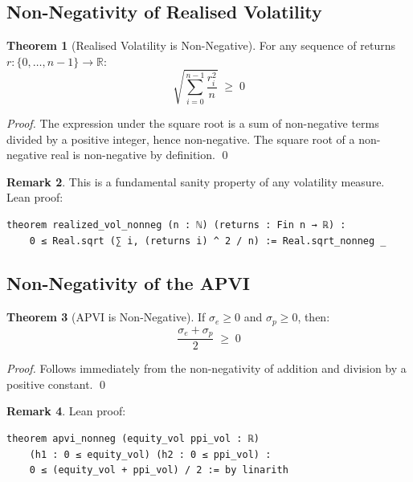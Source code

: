 \documentclass[12pt, a4paper]{article}
\theoremstyle{definition}
\newtheorem{theorem}{Theorem}[section]
\newtheorem{remark}[theorem]{Remark}
\begin{document}
\subsection{Non-Negativity of Realised Volatility}

\begin{theorem}[Realised Volatility is Non-Negative]
\label{thm:vol_nonneg}
For any sequence of returns $r : \{0,\ldots,n-1\} \to \mathbb{R}$:
\[
    \sqrt{\sum_{i=0}^{n-1} \frac{r_i^2}{n}} \;\geq\; 0
\]
\end{theorem}

\begin{proof}
The expression under the square root is a sum of non-negative terms
divided by a positive integer, hence non-negative. The square root of
a non-negative real is non-negative by definition. \qed
\end{proof}

\begin{remark}
This is a fundamental sanity property of any volatility measure.
Lean proof:
\begin{lstlisting}
theorem realized_vol_nonneg (n : ℕ) (returns : Fin n → ℝ) :
    0 ≤ Real.sqrt (∑ i, (returns i) ^ 2 / n) := Real.sqrt_nonneg _
\end{lstlisting}
\end{remark}

\subsection{Non-Negativity of the APVI}

\begin{theorem}[APVI is Non-Negative]
\label{thm:apvi_nonneg}
If $\sigma_e \geq 0$ and $\sigma_p \geq 0$, then:
\[
    \frac{\sigma_e + \sigma_p}{2} \;\geq\; 0
\]
\end{theorem}

\begin{proof}
Follows immediately from the non-negativity of addition and division
by a positive constant. \qed
\end{proof}

\begin{remark}
Lean proof:
\begin{lstlisting}
theorem apvi_nonneg (equity_vol ppi_vol : ℝ)
    (h1 : 0 ≤ equity_vol) (h2 : 0 ≤ ppi_vol) :
    0 ≤ (equity_vol + ppi_vol) / 2 := by linarith
\end{lstlisting}
\end{remark}
\end{document}
